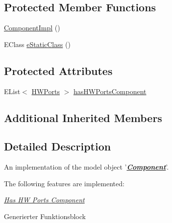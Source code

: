\subsection*{Protected Member Functions}
\begin{DoxyCompactItemize}
\item 
\hyperlink{classshootingmachineemfmodel_1_1impl_1_1_component_impl_a4bb386e3f794193d542bb0b047206e48}{Component\-Impl} ()
\item 
E\-Class \hyperlink{classshootingmachineemfmodel_1_1impl_1_1_component_impl_afb09ad15b9b007946e72330c332d6a8c}{e\-Static\-Class} ()
\end{DoxyCompactItemize}
\subsection*{Protected Attributes}
\begin{DoxyCompactItemize}
\item 
E\-List$<$ \hyperlink{interfaceshootingmachineemfmodel_1_1_h_w_ports}{H\-W\-Ports} $>$ \hyperlink{classshootingmachineemfmodel_1_1impl_1_1_component_impl_a0ab625a8e329a7f772ee3770e82a4831}{has\-H\-W\-Ports\-Component}
\end{DoxyCompactItemize}
\subsection*{Additional Inherited Members}


\subsection{Detailed Description}
An implementation of the model object '{\itshape {\bfseries \hyperlink{interfaceshootingmachineemfmodel_1_1_component}{Component}}}'.

The following features are implemented\-: 
\begin{DoxyItemize}
\item \hyperlink{classshootingmachineemfmodel_1_1impl_1_1_component_impl_a278ec36c9c5c095e447ab6623e7c5900}{{\itshape Has H\-W Ports Component}} 
\end{DoxyItemize}

Generierter Funktionsblock 

